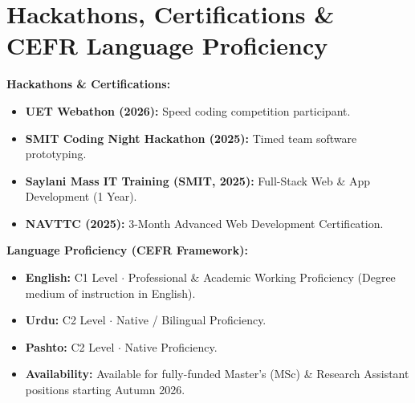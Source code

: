 \documentclass[10pt,a4paper]{article}
\begin{document}
\section{Hackathons, Certifications \& CEFR Language Proficiency}
\begin{minipage}[t]{0.48\textwidth}
    \textbf{Hackathons \& Certifications:}
    \begin{itemize}
        \item \textbf{UET Webathon (2026):} Speed coding competition participant.
        \item \textbf{SMIT Coding Night Hackathon (2025):} Timed team software prototyping.
        \item \textbf{Saylani Mass IT Training (SMIT, 2025):} Full-Stack Web \& App Development (1 Year).
        \item \textbf{NAVTTC (2025):} 3-Month Advanced Web Development Certification.
    \end{itemize}
\end{minipage}
\hfill
\begin{minipage}[t]{0.48\textwidth}
    \textbf{Language Proficiency (CEFR Framework):}
    \begin{itemize}
        \item \textbf{English:} C1 Level $\cdot$ Professional \& Academic Working Proficiency (Degree medium of instruction in English).
        \item \textbf{Urdu:} C2 Level $\cdot$ Native / Bilingual Proficiency.
        \item \textbf{Pashto:} C2 Level $\cdot$ Native Proficiency.
        \item \textbf{Availability:} Available for fully-funded Master’s (MSc) \& Research Assistant positions starting Autumn 2026.
    \end{itemize}
\end{minipage}
\end{document}
